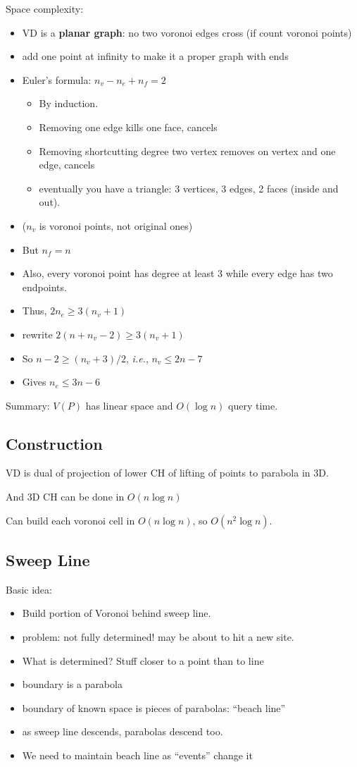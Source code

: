 \documentclass{article}
\begin{document}
Space complexity:
\begin{itemize}
\item VD is a \textbf{ planar graph}: no two voronoi edges cross (if count
  voronoi points)
\item add one point at infinity to make it a proper graph with ends
\item Euler's formula: $n_v-n_e+n_f=2$
\begin{itemize}
\item By induction.  
\item Removing one edge kills one face, cancels
\item Removing shortcutting degree two vertex removes on vertex and
  one edge, cancels
\item eventually you have a triangle: 3 vertices, 3 edges, 2 faces
  (inside and out).
\end{itemize}
\item ($n_v$ is voronoi points, not original ones)
\item But $n_f = n$
\item Also, every voronoi point has degree at least 3 while every edge
  has two endpoints.
\item Thus, $2n_e \ge 3(n_v+1)$
\item rewrite $2(n+n_v-2) \ge 3(n_v+1)$
\item So $n-2 \ge (n_v+3)/2$, \emph{i.e.}, $n_v \le 2n-7$
\item Gives $n_e \le 3n-6$
\end{itemize}

Summary: $V(P)$ has linear space and $O(\log n)$ query time.

\subsection{Construction}

VD is dual of projection of lower CH of lifting of points to parabola in 3D.

And 3D CH can be done in $O(n\log n)$

Can build each voronoi cell in $O(n\log n)$, so $O(n^2\log n)$.

\subsection{Sweep Line}

Basic idea:
\begin{itemize}
\item Build portion of Voronoi behind sweep line.
\item problem: not fully determined!  may be about to hit a new site.
\item What is determined?  Stuff closer to a point than to line
\item boundary is a parabola
\item boundary of known space is pieces of parabolas: ``beach line''
\item as sweep line descends, parabolas descend too. 
\item We need to maintain beach line as ``events'' change it
\end{itemize}
\end{document}
